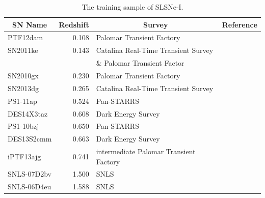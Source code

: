 \begin{table}
\begin{center}
  \caption{The training sample of SLSNe-I.}
\label{tab:PubishedSLSNe}
\begin{tabular}{|l|r|l|l|}
\hline
  \multicolumn{1}{|c|}{SN Name} &
  \multicolumn{1}{c|}{Redshift} &
  \multicolumn{1}{c|}{Survey} &
  \multicolumn{1}{c|}{Reference} \\
\hline
  PTF12dam & 0.108 & Palomar Transient Factory & \citet{Nicholl2013}\\
  SN2011ke & 0.143 & Catalina Real-Time Transient Survey & \citet{2013ApJ...770..128I}\\
  &&\& Palomar Transient Factor & \\
  SN2010gx & 0.230 & Palomar Transient Factory & \citet{2010ApJ...724L..16P}\\
  SN2013dg & 0.265 & Catalina Real-Time Transient Survey & \citet{2014MNRAS.444.2096N} \\
  PS1-11ap & 0.524 & Pan-STARRS & \citet{2014MNRAS.437..656M}\\
  DES14X3taz & 0.608 & Dark Energy Survey & \citet{Smith2016} \\
  PS1-10bzj & 0.650 & Pan-STARRS & \citet{2013ApJ...771...97L}\\
  DES13S2cmm & 0.663 & Dark Energy Survey & \citet{Papadopoulos2015} \\
  iPTF13ajg & 0.741 & intermediate Palomar Transient Factory &\citet{2014ApJ...797...24V}\\
  SNLS-07D2bv & 1.500 & SNLS &\citet{Howell2013}\\
  SNLS-06D4eu & 1.588 & SNLS &\citet{Howell2013}\\
\hline\end{tabular}
\end{center}
\end{table}
